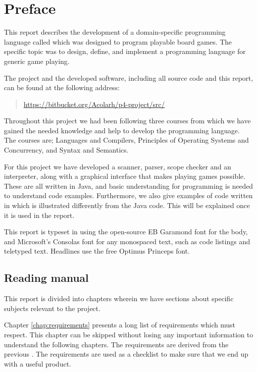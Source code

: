 \chapter*{Preface}
\label{chap:preface}

This report describes the development of a domain-specific programming
language called \productname{} which was designed to program playable board games. The 
specific topic was to design, define, and implement a programming language for 
generic game playing. 

The project and the developed software, including all source code and
this report, can be found at the following address:

\begin{quote}
  \url{https://bitbucket.org/Acolarh/p4-project/src/}  
\end{quote}

Throughout this project we had been following three courses from which we have
gained the needed knowledge and help to develop the programming language. The
courses are; Languages and Compilers, Principles of Operating Systems and
Concurrency, and Syntax and Semantics.

For this project we have developed a scanner, parser, scope checker and
an interpreter, along with a graphical interface that makes playing
games possible. These are all written in Java, and basic understanding
for programming is needed to understand code examples. Furthermore,
we also give examples of code written in \productname{} which is
illustrated differently from the Java code. This will be explained once
it is used in the report.

This report is typeset in \XeTeX{} using the open-source EB Garamond
font for the body, and Microsoft's Consolas font for any monospaced
text, such as code listings and teletyped text. Headlines use the free
Optimus Princeps font.

\section*{Reading manual}

This report is divided into chapters wherein we have sections about specific
subjects relevant to the project.

Chapter \ref{chap:requirements} presents a long list of requirements which
\productname{} must respect. This chapter can be skipped without losing any
important information to understand the following chapters. The requirements are 
derived from the previous . The requirements are used as
a checklist to make sure that we end up with a useful product.

